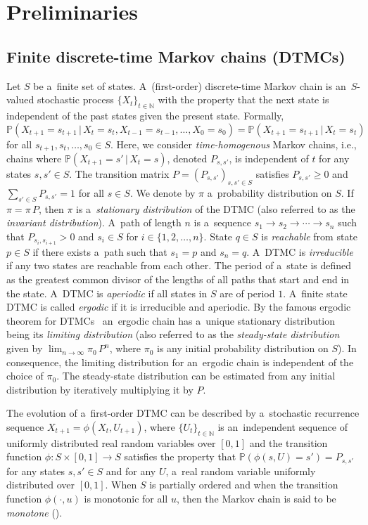 \documentclass[runningheads,a4paper]{llncs}
\begin{document}
\section{Preliminaries}
\label{sec:pre}


\subsection{Finite discrete-time Markov chains (DTMCs)}
\label{ssec:dtmc}
Let $S$ be a~finite set of states. A~(first-order) discrete-time Markov chain is an~$S$-valued
stochastic process $\{X_t\}_{t\in \mathbb{N}}$ with the property that the next state is
independent of the past states given the present state. Formally,
$\mathbb{P}(X_{t+1}=s_{t+1}\,|\,X_t = s_t,X_{t-1} = s_{t-1},\ldots,X_0=s_0) =
\mathbb{P}(X_{t+1}=s_{t+1}\,|\,X_t = s_t)$ for all $s_{t+1},s_t,\ldots, s_0 \in S$. Here, we
consider \emph{time-homogenous} Markov chains, i.e., chains where
$\mathbb{P}(X_{t+1}=s'\,|\,X_t=s)$, denoted $P_{s,s'}$, is independent of $t$ for any states
$s,s'\in S$. The transition matrix $P=(P_{s,s'})_{s,s'\in S}$ satisfies
$P_{s,s'}\geqslant 0$ and $\sum_{s'\in S}P_{s,s'}=1$ for all $s\in S$.
We denote by $\pi$ a~probability distribution on $S$. If $\pi = \pi\, P$, then $\pi$ is
a~\emph{stationary distribution} of the DTMC (also referred to as the \emph{invariant
distribution}). A~path of length $n$ is a~sequence $s_1\to s_2\to\cdots\to s_{n}$ such that
$P_{s_{i},s_{i+1}}>0$ and $s_i \in S$ for $i \in \{1,2,\ldots, n\}$. State $q\in S$ is
\emph{reachable} from state $p\in S$ if there exists a~path such that $s_1 = p$ and $s_{n} = q$.
A~DTMC is \emph{irreducible} if any two states are reachable from each other. The period of
a~state is defined as the greatest common divisor of the lengths of all paths that start and end
in the state. A~DTMC is \emph{aperiodic} if all states in $S$ are of period $1$. A~finite state
DTMC is called \emph{ergodic} if it is irreducible and aperiodic. By the famous ergodic theorem
for DTMCs~\cite{Norris98} an~ergodic chain has a~unique stationary distribution being its
\emph{limiting distribution} (also referred to as the \emph{steady-state distribution} given by
$\lim_{n\to\infty}\pi_0\,P^n$, where $\pi_0$ is any initial probability distribution on $S$). In
consequence, the limiting distribution for an~ergodic chain is independent of the choice of
$\pi_0$. The steady-state distribution can be estimated from any initial distribution by
iteratively multiplying it by $P$.

The evolution of a~first-order DTMC can be described by a~stochastic recurrence sequence $X_{t+1}
= \phi(X_t,U_{t+1})$, where $\{U_{t}\}_{t\in \mathbb{N}}$ is an~independent sequence of uniformly
distributed real random variables over $[0,1]$ and the transition function $\phi:S \times [0,1]
\to S$ satisfies the property that $\mathbb{P}(\phi(s,U)=s')=P_{s,s'}$ for any states $s,s' \in
S$ and for any $U$, a~real random variable uniformly distributed over $[0,1]$. When $S$ is
partially ordered and when the transition function $\phi(\cdot,u)$ is monotonic for all $u$, then
the Markov chain is said to be \emph{monotone} (\cite{PW96,BGV08}).
\end{document}

